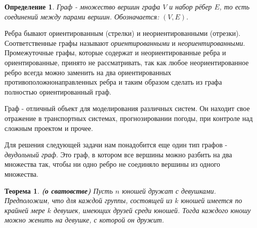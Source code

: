 \documentclass[12pt,a4paper,fleqn]{article}
\newtheorem{definition}{Определение}
\newtheorem{theorem}{Теорема}
\begin{document}
	\begin{definition}
	Граф - множество вершин графа $V$ и набор рёбер $E$, то есть соединений между парами вершин. Обозначается: $(V, E)$.
	\end{definition}
	Ребра бывают ориентированным (стрелки) и неориентированными (отрезки). Соответственные графы называют \textit{ориентированными} и \textit{неориентированными}. Промежуточные графы, которые содержат и неориентированные ребра и ориентированные, принято не рассматривать, так как любое неориентированное ребро всегда можно заменить на два ориентированных противоположнонаправленных ребра и таким образом сделать из графа полностью ориентированный граф.
	
	Граф - отличный объект для моделирования различных систем. Он находит свое отражение в транспортных системах, прогнозировании погоды, при контроле над сложным проектом и прочее. 
	
	Для решения следующей задачи нам понадобится еще один тип графов - \textit{двудольный граф}. Это граф, в котором все вершины можно разбить на два множества так, чтобы ни одно ребро не соединяло вершины из одного множества.
	\begin{theorem}
	\textbf{(о сватовстве)} Пусть $n$ юношей дружат с девушками. Предположим, что для каждой группы, состоящей из $k$ юношей имеется по крайней мере $k$ девушек, имеющих друзей среди юношей. Тогда каждого юношу можно женить на девушке, с которой он дружит.
	\end{theorem} 
	
\end{document}
